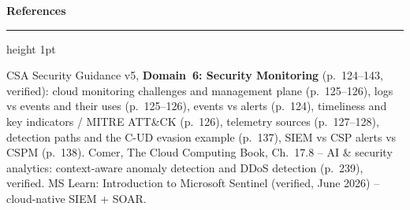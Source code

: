 \documentclass[11pt]{article}
\newcommand{\wbsection}[1]{\par\vspace{11pt}\noindent
  {\large\bfseries\color{kred}#1}\par\vspace{2pt}
  {\color{kred!35}\hrule height 1pt}\par\vspace{6pt}}
\renewcommand{\emph}[1]{\textup{#1}}
\begin{document}
\wbsection{References}
CSA Security Guidance v5, \textbf{Domain~6: Security Monitoring} (p.~124--143, verified): cloud monitoring
challenges and management plane (p.~125--126), logs vs events and their uses (p.~125--126), events vs
alerts (p.~124), timeliness and key indicators / MITRE ATT\&CK (p.~126), telemetry sources (p.~127--128),
detection paths and the C-UD evasion example (p.~137), SIEM vs CSP alerts vs CSPM (p.~138). Comer,
\emph{The Cloud Computing Book}, Ch.~17.8 -- AI \& security analytics: context-aware anomaly detection and
DDoS detection (p.~239), verified. MS Learn: \emph{Introduction to Microsoft Sentinel} (verified, June
2026) -- cloud-native SIEM + SOAR.
\end{document}
